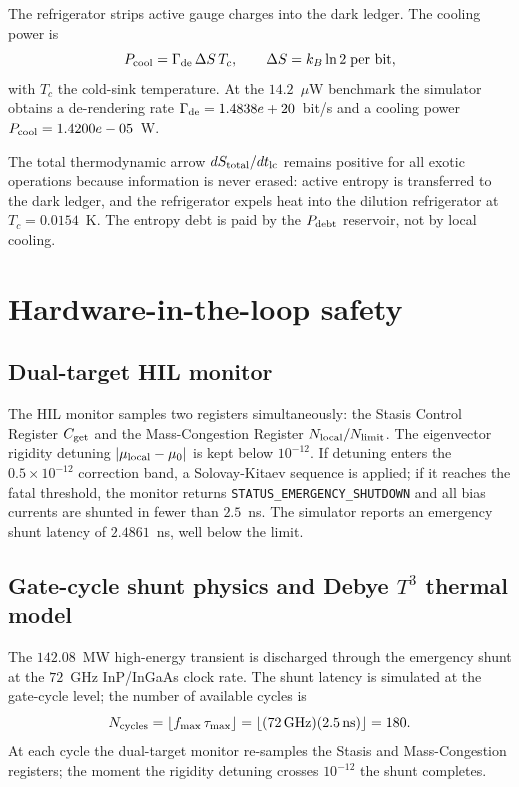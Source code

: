 \documentclass[aps,pra,10pt,onecolumn,superscriptaddress,nofootinbib,longbibliography,floatfix]{revtex4-2}
\newcommand{\ExoticGammaDe}{1.4838e+20}%
\newcommand{\ExoticCoolingPower}{1.4200e-05}%
\newcommand{\ExoticBaselineTempK}{0.0154}%
\newcommand{\ExoticShuntLatencyNs}{2.4861}%
\newcommand{\ExoticShuntCycles}{180}%
\begin{document}
The refrigerator strips active gauge charges into the dark ledger.  The cooling power is
%
\begin{equation}
P_{\rm cool} = \Gamma_{\rm de} \, \Delta S \, T_c,
\qquad
\Delta S = k_B \ln 2 \;\text{per bit} ,
\end{equation}
%
with $T_c$ the cold-sink temperature.  At the $14.2$~$\mu$W benchmark the simulator obtains a de-rendering rate $\Gamma_{\rm de} = \ExoticGammaDe{}$~bit/s and a cooling power $P_{\rm cool} = \ExoticCoolingPower{}$~W.

The total thermodynamic arrow $dS_{\rm total}/dt_{\rm lc}$ remains positive for all exotic operations because information is never erased: active entropy is transferred to the dark ledger, and the refrigerator expels heat into the dilution refrigerator at $T_c = \ExoticBaselineTempK{}$~K.  The entropy debt is paid by the $P_{\rm debt}$ reservoir, not by local cooling.

\section{Hardware-in-the-loop safety}

\subsection{Dual-target HIL monitor}

The HIL monitor samples two registers simultaneously: the Stasis Control Register $C_{\rm get}$ and the Mass-Congestion Register $N_{\rm local}/N_{\rm limit}$.  The eigenvector rigidity detuning $|\mu_{\rm local} - \mu_0|$ is kept below $10^{-12}$.  If detuning enters the $0.5 \times 10^{-12}$ correction band, a Solovay-Kitaev sequence is applied; if it reaches the fatal threshold, the monitor returns \texttt{STATUS\_EMERGENCY\_SHUTDOWN} and all bias currents are shunted in fewer than $2.5$~ns.  The simulator reports an emergency shunt latency of $\ExoticShuntLatencyNs{}$~ns, well below the limit.

\subsection{Gate-cycle shunt physics and Debye \texorpdfstring{$T^3$}{T3} thermal model}

The $142.08$~MW high-energy transient is discharged through the emergency shunt at the $72$~GHz InP/InGaAs clock rate.  The shunt latency is simulated at the gate-cycle level; the number of available cycles is
%
\begin{equation}
N_{\rm cycles} = \lfloor f_{\max} \, \tau_{\max} \rfloor
= \lfloor (72\,\mathrm{GHz})(2.5\,\mathrm{ns}) \rfloor = \ExoticShuntCycles{}.
\end{equation}
%
At each cycle the dual-target monitor re-samples the Stasis and Mass-Congestion registers; the moment the rigidity detuning crosses $10^{-12}$ the shunt completes.
\end{document}
